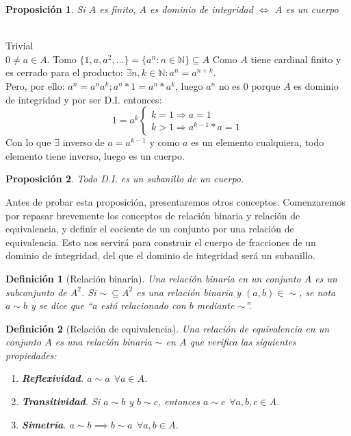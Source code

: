 \documentclass[11pt, a4paper, titlepage]{article}
\makeatletter
\renewenvironment{proof}[1][\proofname] {\vspace{-15pt}\par\pushQED{\qed}\normalfont\topsep6\p@\@plus6\p@\relax\trivlist\item[\hskip\labelsep\it#1\@addpunct{.}]\ignorespaces}{\popQED\endtrivlist\@endpefalse}
\theoremstyle{theorem-style}
\newtheorem*{nprop}{Proposición}
\theoremstyle{definition-style}
\newtheorem*{ndef}{Definición}
\theoremstyle{remark-style}
\theoremstyle{example-style}
\newenvironment{nlist}
{\begin{enumerate}
\renewcommand\labelenumi{(\emph{\roman{enumi})}}}
{\end{enumerate}}
\makeatother
\begin{document}
\begin{nprop}
	Si $A$ es finito, $A$ es dominio de integridad $\iff$ $A$ es un cuerpo
\end{nprop}
\begin{proof}\hfill\\
	\boxed{\Leftarrow} Trivial\\
	\boxed{\Rightarrow} $0 \neq a \in A$.
Tomo $\{1,a,a^2,\dots\} = \{a^n: n\in \mathbb{N}\} \subseteq A$
Como $A$ tiene cardinal finito y es cerrado para el producto: $\exists n,k \in \mathbb{N} : a^n = a^{n+k}$.\\
Pero, por ello: $a^n = a^n a^k; a^n * 1 = a^n * a^k$, luego $a^n$ no es 0 porque $A$ es dominio de integridad y por ser D.I. entonces:
\[
1=a^k \begin{cases}
	k = 1 \Rightarrow a = 1\\
	k > 1 \Rightarrow a^{k-1}*a = 1
	
\end{cases}\]
Con lo que $\exists$ inverso de $a = a^{k-1}$ y como $a$ es un elemento cualquiera, todo elemento tiene inverso, luego es un cuerpo.
\end{proof}


\begin{nprop}
	Todo D.I. es un subanillo de un cuerpo.
\end{nprop}


Antes de probar esta proposición, presentaremos otros conceptos. Comenzaremos por repasar brevemente los conceptos de relación binaria y
relación de equivalencia, y definir el cociente de un conjunto por una relación de equivalencia. Esto nos servirá
para construir el cuerpo de fracciones de un dominio de integridad, del que el dominio de integridad será un subanillo.

\begin{ndef}[Relación binaria]
  Una relación binaria en un conjunto $A$ es un subconjunto de $A^2$.
  Si $\sim \ \subseteq A^2$ es una relación binaria y $(a,b) \in \sim$, se nota $a \sim b$
  y se dice que ``$a$ está relacionado con $b$ mediante $\sim$''.
\end{ndef}

\begin{ndef}[Relación de equivalencia]
  Una relación de equivalencia en un conjunto $A$ es una relación binaria $\sim$ en $A$ que verifica las siguientes propiedades:

  \begin{nlist}
  \item \textbf{\emph{Reflexividad}}. $a \sim a \ \ \forall a \in A$.
  \item \textbf{\emph{Transitividad}}. Si $a \sim b$ y $b \sim c$, entonces $a \sim c \ \ \forall a,b,c \in A$.
    \item \textbf{\emph{Simetría}}. $a \sim b \implies b \sim a \ \ \forall a,b \in A$.
  \end{nlist}
\end{ndef}
\end{document}
